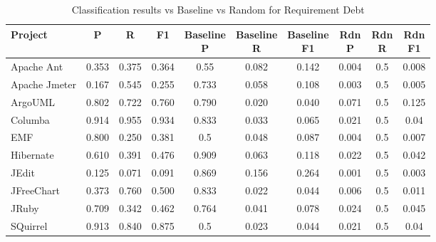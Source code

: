 \begin{table}[!hbt]
    \begin{center}
        \caption{Classification results vs Baseline vs Random for Requirement Debt}
        \label{tbl:classifier_results_vs_baseline_requirement}
        \begin{tabular}{l| c c c c c c c c c}
        \toprule
        \textbf{Project} & \textbf{P} & \textbf{R} & \textbf{F1} & \thead{Baseline\\P} & \thead{Baseline\\R} & \thead{Baseline\\F1} & \thead{Rdn\\P} & \thead{Rdn\\R} & \thead{Rdn\\F1} \\
        \midrule
        Apache Ant    &  0.353 &  0.375 & 0.364 & 0.55  & 0.082 & 0.142  & 0.004 &0.5 & 0.008  \\
        Apache Jmeter &  0.167 &  0.545 & 0.255 & 0.733 & 0.058 & 0.108  & 0.003 &0.5 & 0.005  \\
        ArgoUML       &  0.802 &  0.722 & 0.760 & 0.790 & 0.020 & 0.040  & 0.071 &0.5 & 0.125  \\
        Columba       &  0.914 &  0.955 & 0.934 & 0.833 & 0.033 & 0.065  & 0.021 &0.5 &  0.04  \\
        EMF           &  0.800 &  0.250 & 0.381 & 0.5   & 0.048 & 0.087  & 0.004 &0.5 & 0.007  \\
        Hibernate     &  0.610 &  0.391 & 0.476 & 0.909 & 0.063 & 0.118  & 0.022 &0.5 & 0.042  \\
        JEdit         &  0.125 &  0.071 & 0.091 & 0.869 & 0.156 & 0.264  & 0.001 &0.5 & 0.003  \\
        JFreeChart    &  0.373 &  0.760 & 0.500 & 0.833 & 0.022 & 0.044  & 0.006 &0.5 & 0.011  \\
        JRuby         &  0.709 &  0.342 & 0.462 & 0.764 & 0.041 & 0.078  & 0.024 &0.5 & 0.045  \\
        SQuirrel      &  0.913 &  0.840 & 0.875 & 0.5   & 0.023 & 0.044  & 0.021 &0.5 &  0.04  \\
        \bottomrule
        \end{tabular}
    \end{center}    
\end{table}

\clearpage

